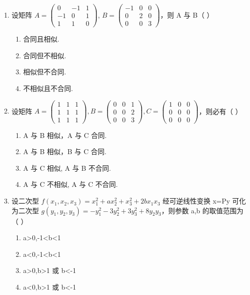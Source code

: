 \documentclass[12pt, a4paper]{ctexart}
\begin{document}
\begin{enumerate}
    \item 设矩阵 $ A = \begin{pmatrix} 0 & -1 & 1 \\ -1 & 0 & 1 \\ 1 & 1 & 0 \end{pmatrix} $, $ B = \begin{pmatrix} -1 & 0 & 0 \\ 0 & 2 & 0 \\ 0 & 0 & 3 \end{pmatrix} $，则 A 与 B（ \underline{\hspace{1cm}} ）
    \begin{enumerate}[label=(\Alph*)]
        \item 合同且相似.
        \item 合同但不相似.
        \item 相似但不合同.
        \item 不相似且不合同.
    \end{enumerate}

    \item 设矩阵 $ A=\begin{pmatrix}1&1&1\\1&1&1\\1&1&1\end{pmatrix},B=\begin{pmatrix}0&0&1\\0&0&2\\0&0&3\end{pmatrix},C=\begin{pmatrix}1&0&0\\0&0&0\\0&0&0\end{pmatrix} $，则必有（ \underline{\hspace{1cm}} ）
    \begin{enumerate}[label=(\Alph*)]
        \item A 与 B 相似，A 与 C 合同.
        \item A 与 B 相似，B 与 C 合同.
        \item A 与 C 相似, A 与 B 不合同.
        \item A 与 C 不相似, A 与 C 不合同.
    \end{enumerate}

    \item 设二次型 $ f(x_{1},x_{2},x_{3})=x_{1}^{2}+ax_{2}^{2}+x_{3}^{2}+2bx_{1}x_{3} $ 经可逆线性变换 x=Py 可化为二次型 $ g(y_{1},y_{2},y_{3})=-y_{1}^{2}-3y_{2}^{2}+3y_{3}^{2}+8y_{2}y_{3} $，则参数 a,b 的取值范围为（ \underline{\hspace{1cm}} ）
    \begin{enumerate}[label=(\Alph*)]
        \item a>0,-1<b<1
        \item a<0,-1<b<1
        \item a>0,b>1 或 b<-1
        \item a<0,b>1 或 b<-1
    \end{enumerate}
\end{enumerate}
\end{document}
